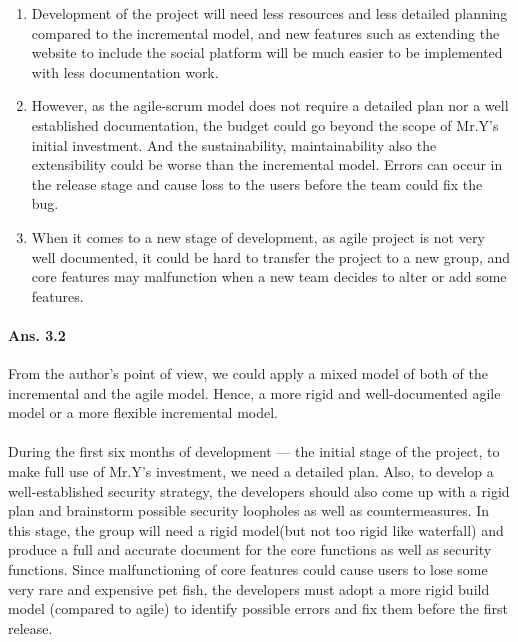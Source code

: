 \documentclass[paper=a4, fontsize=11pt]{scrartcl} %
\numberwithin{equation}{section} %
\numberwithin{figure}{section} %
\numberwithin{table}{section} %
\begin{document}
\begin{itemize}
\begin{enumerate}
		\item Development of the project will need less resources and less detailed planning compared to the incremental model, and new features such as extending the website to include the social platform will be much easier to be implemented with less documentation work.
		\item However, as the agile-scrum model does not require a detailed plan nor a well established documentation, the budget could go beyond the scope of Mr.Y's initial investment. And the sustainability, maintainability also the extensibility\cite{agilemodel} could be worse than the incremental model. Errors can occur in the release stage and cause loss to the users before the team could fix the bug.
		\item When it comes to a new stage of development, as agile project is not very well documented, it could be hard to transfer the project to a new group, and core features may malfunction when a new team decides to alter or add some features.
	\end{enumerate}
\end{itemize}
\paragraph{Ans. 3.2}From the author's point of view, we could apply a mixed model of both of the incremental and the agile model. Hence, a more rigid and well-documented agile model or a more flexible incremental model.

\paragraph{} During the first six months\cite{case} of development --- the initial stage of the project, to make full use of Mr.Y's investment, we need a detailed plan. Also, to develop a well-established security strategy, the developers should also come up with a rigid plan and brainstorm possible security loopholes as well as countermeasures. In this stage, the group will need a rigid model(but not too rigid like waterfall) and produce a full and accurate document for the core functions as well as security functions. Since malfunctioning of core features could cause users to lose some very rare and expensive pet fish, the developers must adopt a more rigid build model (compared to agile) to identify possible errors and fix them before the first release.
\end{document}

